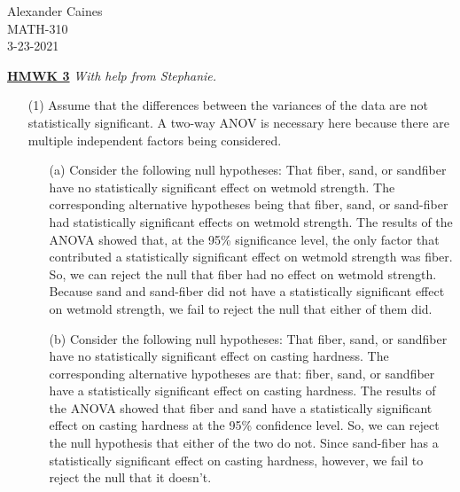 \documentclass[12pt]{article}
\begin{document}
\vspace{1.0 \baselineskip}

\begin{flushright}
	Alexander Caines\\
	MATH-310\\
	3-23-2021\\
\end{flushright}

\begin{center}
	\textbf{\underline{HMWK 3}}
	\emph{With help from Stephanie.}
\end{center}



\begin{enumerate}
	\item[(1)] Assume that the differences between the variances of the data are not statistically significant. A two-way
		 ANOV is necessary here because there are multiple independent factors being considered.\\
		\begin{enumerate}
			\item[(a)] Consider the following null hypotheses: That fiber, sand, or sandfiber have no statistically significant 
			effect on wetmold strength. The corresponding alternative hypotheses being that fiber, sand, or sand-fiber had 
			statistically significant effects on wetmold strength. The results of the ANOVA showed that, at the 95\% 
			significance level, the 
			only factor that contributed a statistically significant effect on wetmold strength was fiber. So, 
			we can reject the null that fiber had no effect on wetmold strength. Because sand and sand-fiber 
			did not have a statistically significant effect on wetmold strength, we fail to reject the null that 
			either of them did.\\ 
			\item[(b)] Consider the following null hypotheses: That fiber, sand, or sandfiber have no statistically significant 
			effect on casting hardness. The corresponding alternative hypotheses are that: fiber, sand, or sandfiber have a 
			statistically significant effect on casting hardness. The results of the ANOVA showed that fiber and sand have a 
			statistically significant effect on casting hardness at the 95\% confidence level. So, we can reject the null 
			hypothesis that either of the two do not. Since sand-fiber has a statistically significant effect on casting hardness, 
			however, we fail to reject the null that it doesn't. 

\end{enumerate}
\end{enumerate}
\end{document}
